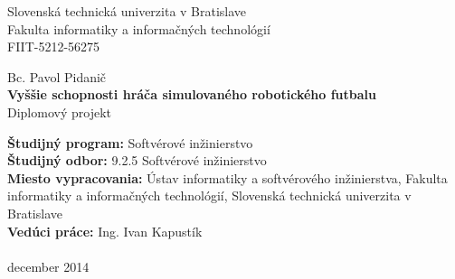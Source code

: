 
%
\begin{titlepage}
	\begin{center}
	\large Slovenská technická univerzita v Bratislave \\ \Large Fakulta informatiky a informačných technológií
	\\ \large FIIT-5212-56275
	\end{center}
	\vfill
	\begin{center}
	\Large Bc. Pavol Pidanič \\
	\LARGE \textbf{Vyššie schopnosti hráča simulovaného robotického futbalu} \\
	\large Diplomový projekt
	\end{center}
	\vfill
	\small
	\textbf{Študijný program:} Softvérové inžinierstvo \\
	\textbf{Študijný odbor:} 9.2.5 Softvérové inžinierstvo \\
	\textbf{Miesto vypracovania:} Ústav informatiky a softvérového inžinierstva, Fakulta informatiky a informačných technológií, Slovenská technická univerzita v Bratislave \\
	\textbf{Vedúci práce:} Ing. Ivan Kapustík \\\\
	december 2014
	\normalsize
\end{titlepage}
%